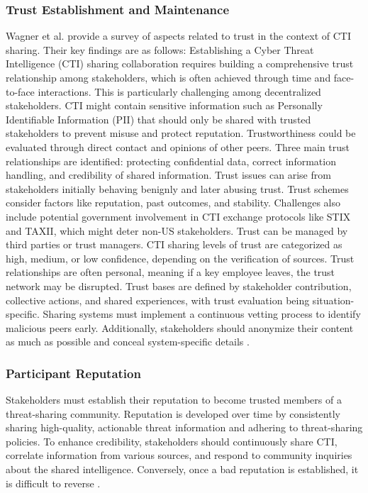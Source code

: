\subsubsection{Trust Establishment and Maintenance}
Wagner et al. \cite{wagner_cyber_2019} provide a survey of aspects related to trust in the context of CTI sharing. Their key findings are as follows:
Establishing a Cyber Threat Intelligence (CTI) sharing collaboration requires building a comprehensive trust relationship among stakeholders, which is often achieved through time and face-to-face interactions. 
This is particularly challenging among decentralized stakeholders. 
CTI might contain sensitive information such as Personally Identifiable Information (PII) that should only be shared with trusted stakeholders to prevent misuse and protect reputation. 
Trustworthiness could be evaluated through direct contact and opinions of other peers. Three main trust relationships are identified: protecting confidential data, correct information handling, and credibility of shared information. Trust issues can arise from stakeholders initially behaving benignly and later abusing trust. Trust schemes consider factors like reputation, past outcomes, and stability. Challenges also include potential government involvement in CTI exchange protocols like STIX and TAXII, which might deter non-US stakeholders. Trust can be managed by third parties or trust managers. CTI sharing levels of trust are categorized as high, medium, or low confidence, depending on the verification of sources. Trust relationships are often personal, meaning if a key employee leaves, the trust network may be disrupted. Trust bases are defined by stakeholder contribution, collective actions, and shared experiences, with trust evaluation being situation-specific. Sharing systems must implement a continuous vetting process to identify malicious peers early. Additionally, stakeholders should anonymize their content as much as possible and conceal system-specific details \cite{wagner_cyber_2019}.

\subsubsection{Participant Reputation}
Stakeholders must establish their reputation to become trusted members of a threat-sharing community. Reputation is developed over time by consistently sharing high-quality, actionable threat information and adhering to threat-sharing policies. To enhance credibility, stakeholders should continuously share CTI, correlate information from various sources, and respond to community inquiries about the shared intelligence. Conversely, once a bad reputation is established, it is difficult to reverse \cite{wagner_cyber_2019}. 

